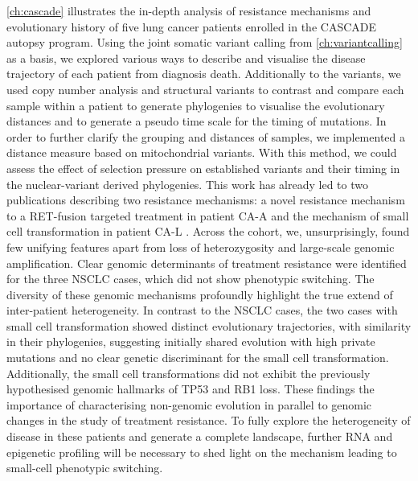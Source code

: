 \autoref{ch:cascade} illustrates the in-depth analysis of resistance mechanisms and evolutionary history of five lung cancer patients enrolled in the CASCADE autopsy program. Using the joint somatic variant calling from \autoref{ch:variantcalling} as a basis, we explored various ways to describe and visualise the disease trajectory of each patient from diagnosis  death. Additionally to the variants, we used copy number analysis and structural variants to contrast and compare each sample within a patient to generate phylogenies to visualise the evolutionary distances and to generate a pseudo time scale for the timing of mutations. In order to further clarify the grouping and distances of samples, we implemented a distance measure based on mitochondrial variants. With this method, we could assess the effect of selection pressure on established variants and their timing in the nuclear-variant derived phylogenies. This work has already led to two publications describing two resistance mechanisms: a novel resistance mechanism to a RET-fusion targeted treatment in patient CA-A \cite{Solomon2020} and the mechanism of small cell transformation in patient CA-L \cite{Burr2019}. Across the cohort, we, unsurprisingly, found few unifying features apart from loss of heterozygosity and large-scale genomic amplification. Clear genomic determinants of treatment resistance were identified for the three NSCLC cases, which did not show phenotypic switching. The diversity of these genomic mechanisms profoundly highlight the true extend of inter-patient heterogeneity. In contrast to the NSCLC cases, the two cases with small cell transformation showed distinct evolutionary trajectories, with similarity in their  phylogenies, suggesting initially shared evolution with high private mutations and no clear genetic discriminant for the small cell transformation. Additionally, the small cell transformations did not exhibit the previously hypothesised genomic hallmarks of TP53 and RB1 loss. These findings  the importance of characterising non-genomic evolution in parallel to genomic changes in the study of treatment resistance. To fully explore the heterogeneity of disease in these patients and generate a complete landscape, further RNA and epigenetic profiling will be necessary to shed light on the mechanism leading to small-cell phenotypic switching.

